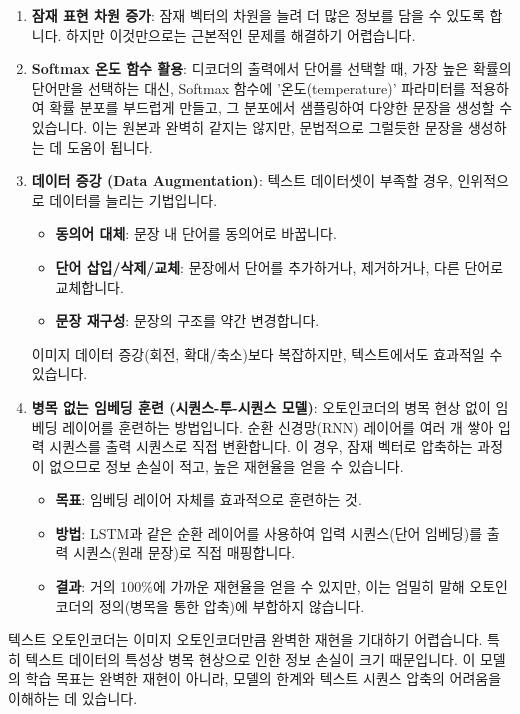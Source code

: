 \documentclass[11pt,a4paper]{article}
\theoremstyle{definition}
\begin{document}
\begin{enumerate}
    \item \textbf{잠재 표현 차원 증가}: 잠재 벡터의 차원을 늘려 더 많은 정보를 담을 수 있도록 합니다. 하지만 이것만으로는 근본적인 문제를 해결하기 어렵습니다.
    \item \textbf{Softmax 온도 함수 활용}: 디코더의 출력에서 단어를 선택할 때, 가장 높은 확률의 단어만을 선택하는 대신, Softmax 함수에 '온도(temperature)' 파라미터를 적용하여 확률 분포를 부드럽게 만들고, 그 분포에서 샘플링하여 다양한 문장을 생성할 수 있습니다. 이는 원본과 완벽히 같지는 않지만, 문법적으로 그럴듯한 문장을 생성하는 데 도움이 됩니다.
    \item \textbf{데이터 증강 (Data Augmentation)}: 텍스트 데이터셋이 부족할 경우, 인위적으로 데이터를 늘리는 기법입니다.
    \begin{itemize}
        \item \textbf{동의어 대체}: 문장 내 단어를 동의어로 바꿉니다.
        \item \textbf{단어 삽입/삭제/교체}: 문장에서 단어를 추가하거나, 제거하거나, 다른 단어로 교체합니다.
        \item \textbf{문장 재구성}: 문장의 구조를 약간 변경합니다.
    \end{itemize}
    이미지 데이터 증강(회전, 확대/축소)보다 복잡하지만, 텍스트에서도 효과적일 수 있습니다.
    \item \textbf{병목 없는 임베딩 훈련 (시퀀스-투-시퀀스 모델)}: 오토인코더의 병목 현상 없이 임베딩 레이어를 훈련하는 방법입니다. 순환 신경망(RNN) 레이어를 여러 개 쌓아 입력 시퀀스를 출력 시퀀스로 직접 변환합니다. 이 경우, 잠재 벡터로 압축하는 과정이 없으므로 정보 손실이 적고, 높은 재현율을 얻을 수 있습니다.
    \begin{itemize}
        \item \textbf{목표}: 임베딩 레이어 자체를 효과적으로 훈련하는 것.
        \item \textbf{방법}: LSTM과 같은 순환 레이어를 사용하여 입력 시퀀스(단어 임베딩)를 출력 시퀀스(원래 문장)로 직접 매핑합니다.
        \item \textbf{결과}: 거의 100\%에 가까운 재현율을 얻을 수 있지만, 이는 엄밀히 말해 오토인코더의 정의(병목을 통한 압축)에 부합하지 않습니다.
    \end{itemize}
\end{enumerate}

\begin{tcolorbox}[summary={텍스트 오토인코더의 현실적 목표}]
텍스트 오토인코더는 이미지 오토인코더만큼 완벽한 재현을 기대하기 어렵습니다. 특히 텍스트 데이터의 특성상 병목 현상으로 인한 정보 손실이 크기 때문입니다. 이 모델의 학습 목표는 완벽한 재현이 아니라, 모델의 한계와 텍스트 시퀀스 압축의 어려움을 이해하는 데 있습니다.
\end{tcolorbox}
\end{document}
